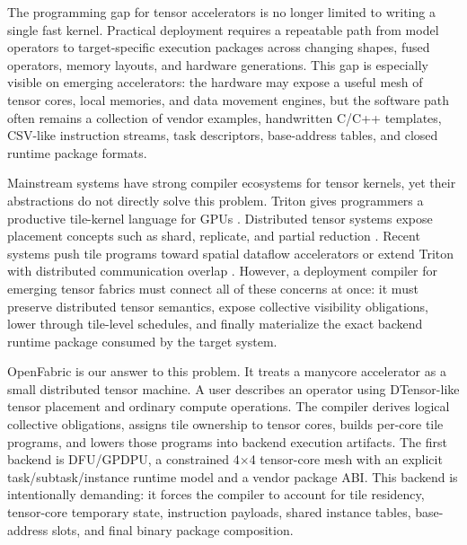 \documentclass[conference]{IEEEtran}
\newcommand{\systemname}{OpenFabric}
\newcommand{\targetbackend}{DFU/GPDPU}
\newcommand{\meshsize}{4$\times$4}
\begin{document}
The programming gap for tensor accelerators is no longer limited to writing a
single fast kernel. Practical deployment requires a repeatable path from model
operators to target-specific execution packages across changing shapes, fused
operators, memory layouts, and hardware generations. This gap is especially
visible on emerging accelerators: the hardware may expose a useful mesh of
tensor cores, local memories, and data movement engines, but the software path
often remains a collection of vendor examples, handwritten C/C++ templates,
CSV-like instruction streams, task descriptors, base-address tables, and closed
runtime package formats.

Mainstream systems have strong compiler ecosystems for tensor kernels, yet their
abstractions do not directly solve this problem. Triton gives programmers a
productive tile-kernel language for GPUs \cite{triton}. Distributed tensor
systems expose placement concepts such as shard, replicate, and partial
reduction \cite{dtensor}. Recent systems push tile programs toward spatial
dataflow accelerators \cite{tileloom} or extend Triton with distributed
communication overlap \cite{triton_distributed}. However, a deployment compiler
for emerging tensor fabrics must connect all of these concerns at once: it must
preserve distributed tensor semantics, expose collective visibility obligations,
lower through tile-level schedules, and finally materialize the exact backend
runtime package consumed by the target system.

\systemname{} is our answer to this problem. It treats a manycore accelerator as
a small distributed tensor machine. A user describes an operator using
DTensor-like tensor placement and ordinary compute operations. The compiler
derives logical collective obligations, assigns tile ownership to tensor cores,
builds per-core tile programs, and lowers those programs into backend execution
artifacts. The first backend is \targetbackend{}, a constrained \meshsize{}
tensor-core mesh with an explicit task/subtask/instance runtime model and a
vendor package ABI. This backend is intentionally demanding: it forces the
compiler to account for tile residency, tensor-core temporary state, instruction
payloads, shared instance tables, base-address slots, and final binary package
composition.
\end{document}

